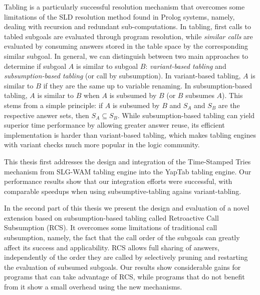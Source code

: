 Tabling is a particularly successful resolution mechanism that overcomes some limitations
of the SLD resolution method found in Prolog systems, namely, dealing with recursion and redundant
sub-computations. In tabling, first calls to tabled subgoals are evaluated through
program resolution, while \emph{similar calls} are evaluated by consuming answers stored
in the table space by the corresponding similar subgoal.
In general, we can distinguish between two main approaches to determine if subgoal $A$ is
similar to subgoal $B$: \emph{variant-based tabling} and \emph{subsumption-based tabling}
(or call by subsumption). In variant-based tabling, $A$ is similar to $B$ if they are the same
up to variable renaming. In subsumption-based tabling, $A$ is similar to $B$ when $A$ is subsumed
by $B$ (or $B$ subsumes $A$). This stems from a simple principle: if $A$ is subsumed by $B$ and
$S_A$ and $S_B$ are the respective answer sets, then $S_A \subseteq S_B$.
While subsumption-based tabling can yield superior time performance by allowing greater answer
reuse, its efficient implementation is harder than variant-based tabling, which makes tabling engines
with variant checks much more popular in the logic community.

This thesis first addresses the design and integration of the Time-Stamped Tries mechanism
from SLG-WAM tabling engine into the YapTab tabling engine. Our performance results show that our
integration efforts were successful, with comparable speedups when using subsumptive-tabling agains
variant-tabling.

In the second part of this thesis we present the design and evaluation of a novel extension
based on subsumption-based tabling called Retroactive Call Subsumption (RCS). It overcomes some limitations
of traditional call subsumption, namely, the fact that the call order of the subgoals can greatly affect its
success and applicability. RCS allows full sharing of answers,
independently of the order they are called by selectively pruning and restarting the evaluation of subsumed
subgoals. Our results show considerable gains for programs that can take advantage of RCS, while programs
that do not benefit from it show a small overhead using the new mechanisms.